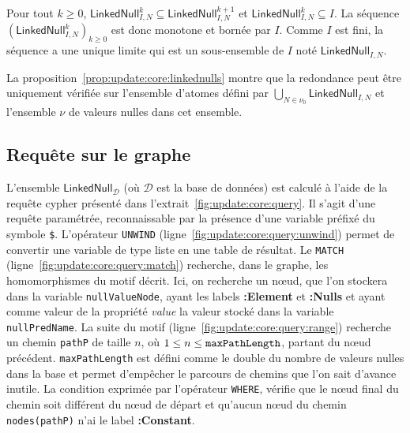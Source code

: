 
\begin{proposition}
	\label{prop:update:core:linkednulls}
	Pour tout $k \geq 0$, $\textsf{LinkedNull}^k_{I,N} \subseteq \textsf{LinkedNull}^{k+1}_{I,N}$ et $\textsf{LinkedNull}^k_{I,N} \subseteq I$.
	La séquence $(\textsf{LinkedNull}^k_{I,N})_{k \ge 0}$ est donc monotone et bornée par $I$.
	Comme $I$ est fini, la séquence a une unique limite qui est un sous-ensemble de $I$ noté $\textsf{LinkedNull}_{I,N}$.
\end{proposition}

La proposition~\ref{prop:update:core:linkednulls} montre que la redondance peut être uniquement vérifiée sur l'ensemble d'atomes défini par $\bigcup_{N \in \nu_0}\textsf{LinkedNull}_{I,N}$ et l'ensemble $\nu$ de valeurs nulles dans cet ensemble.

\subsection{Requête sur le graphe}
L'ensemble $\textsf{LinkedNull}_{\mathcal{D}}$ (où $\mathcal{D}$ est la base de données) est calculé à l'aide de la requête \gls{cypher} présenté dans l'extrait~\ref{fig:update:core:query}.
Il s'agit d'une requête paramétrée, reconnaissable par la présence d'une variable préfixé du symbole \verb|$|.
L'opérateur \verb|UNWIND| (ligne~\ref{fig:update:core:query:unwind}) permet de convertir une variable de type liste en une table de résultat.
Le \verb|MATCH| (ligne~\ref{fig:update:core:query:match}) recherche, dans le graphe, les homomorphismes du motif décrit.
Ici, on recherche un nœud, que l'on stockera dans la variable \verb|nullValueNode|, ayant les labels \textbf{:Element} et \textbf{:Nulls} et ayant comme valeur de la propriété \textit{value} la valeur stocké dans la variable \verb|nullPredName|.
La suite du motif (ligne~\ref{fig:update:core:query:range}) recherche un chemin \verb|pathP| de taille $n$, où $1 \leq n \leq \verb|maxPathLength|$, partant du nœud précédent.
\verb|maxPathLength| est défini comme le double du nombre de valeurs nulles dans la base et permet d'empêcher le parcours de chemins que l'on sait d'avance inutile.
La condition exprimée par l'opérateur \verb|WHERE|, vérifie que le nœud final du chemin soit différent du nœud de départ et qu'aucun nœud du chemin \verb|nodes(pathP)| n'ai le label \textbf{:Constant}.

